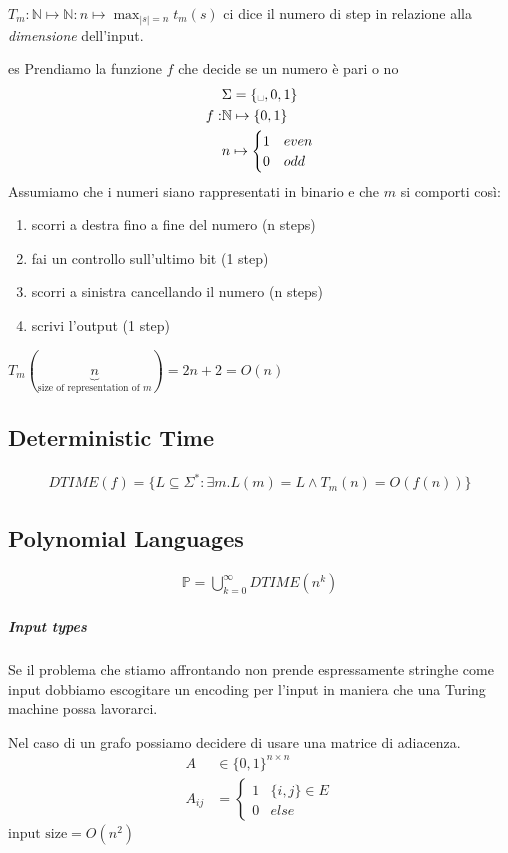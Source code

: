 \documentclass{article}
\newcommand{\tvs}[0]{\text{\textvisiblespace}}
\newcommand{\N}[0]{\ensuremath{\mathbb{N}}}
\begin{document}
$T_m:\N\mapsto\N:n\mapsto \max_{|s|=n} t_m(s)$ ci dice il numero di step in relazione alla \textit{dimensione} dell'input.

\begin{callout}{es}
    Prendiamo la funzione $f$ che decide se un numero è pari o no 
    \begin{align*}
        &\Sigma=\{\tvs,0,1\} \\
        f:&\N\mapsto\{0,1\} \\
          &n\mapsto \begin{cases}
              1 & even \\
              0 & odd
          \end{cases}
    \end{align*}
    Assumiamo che i numeri siano rappresentati in binario e che $m$ si comporti così:
    \begin{enumerate}
        \item scorri a destra fino a fine del numero (n steps)
        \item fai un controllo sull'ultimo bit (1 step)
        \item scorri a sinistra cancellando il numero (n steps)
        \item scrivi l'output (1 step)
    \end{enumerate}
    $T_m(\underbrace{n}_{\text{size of representation of $m$}})=2n+2 = O(n)$
\end{callout}

\subsection{Deterministic Time}
\begin{align*}
    DTIME(f) = \{L\subseteq\Sigma^*:\exists m. L(m)=L\wedge T_m(n)=O(f(n))\}
\end{align*}

\subsection{Polynomial Languages}
\begin{align*}
    \mathbb{P} = \bigcup_{k=0}^\infty DTIME(n^k)
\end{align*}

\subparagraph{Input types}
Se il problema che stiamo affrontando non prende espressamente stringhe come input dobbiamo escogitare un encoding per l'input in maniera che una Turing machine possa lavorarci.

Nel caso di un grafo possiamo decidere di usare una matrice di adiacenza.
\begin{align*}
    A&\in\{0,1\}^{n\times n} \\
    A_{ij} &= \begin{cases}
        1 & \{i,j\} \in E \\
        0 & else
    \end{cases}
\end{align*}
$\text{input size} = O(n^2)$
\end{document}
